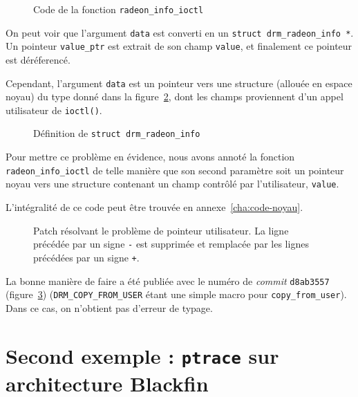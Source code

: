 \begin{figure}[h]
\caption{Code de la fonction \texttt{radeon\_info\_ioctl}}
\label{fig:kms-buggy}
\end{figure}

On peut voir que l'argument \texttt{data} est converti en un \texttt{struct
drm\_radeon\_info *}. Un pointeur \texttt{value\_ptr} est extrait de son champ
\texttt{value}, et finalement ce pointeur est déréferencé.

Cependant, l'argument \texttt{data} est un pointeur vers une structure (allouée
en espace noyau) du type donné dans la figure~\ref{fig:kms-info}, dont les
champs proviennent d'un appel utilisateur de \verb!ioctl()!.


\begin{figure}[h]
\caption{Définition de \texttt{struct drm\_radeon\_info}}
\label{fig:kms-info}
\end{figure}

Pour mettre ce problème en évidence, nous avons annoté la fonction
\texttt{radeon\_info\_ioctl} de telle manière que son second paramètre soit un
pointeur noyau vers une structure contenant un champ contrôlé par l'utilisateur,
\texttt{value}.

L'intégralité de ce code peut être trouvée en annexe~\ref{cha:code-noyau}.

\begin{figure}

  \caption[Patch résolvant le problème de pointeur utilisateur.]
      {Patch résolvant le problème de pointeur utilisateur.
       La ligne précédée par un signe \texttt{-} est supprimée et remplacée
       par les lignes précédées par un signe \texttt{+}.
      }
\label{fig:linux-patch}
\end{figure}

La bonne manière de faire a été publiée avec le numéro de \emph{commit}
\texttt{d8ab3557} (figure~\ref{fig:linux-patch}) (\texttt{DRM\_COPY\_FROM\_USER}
étant une simple macro pour \texttt{copy\_from\_user}). Dans ce cas, on
n'obtient pas d'erreur de typage.

\section{Second exemple : \texttt{ptrace} sur architecture Blackfin}

